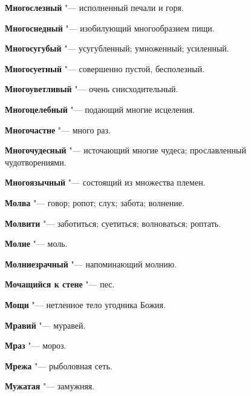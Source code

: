 \begin{mymulticols}{2}
\noindent\textbf{Многослезный} "--- исполненный печали и горя. 




\noindent\textbf{Многоснедный} "--- изобилующий многообразием пищи. 




\noindent\textbf{Многосугубый} "--- усугубленный; умноженный; усиленный. 




\noindent\textbf{Многосуетный} "--- совершенно пустой, бесполезный. 




\noindent\textbf{Многоуветливый} "--- очень снисходительный. 




\noindent\textbf{Многоцелебный} "--- подающий многие исцеления. 




\noindent\textbf{Многочастне} "--- много раз. 




\noindent\textbf{Многочудесный} "--- источающий многие чудеса; прославленный чудотворениями. 




\noindent\textbf{Многоязычный} "--- состоящий из множества племен. 




\noindent\textbf{Молва} "--- говор; ропот; слух; забота; волнение. 




\noindent\textbf{Молвити} "--- заботиться; суетиться; волноваться; роптать. 




\noindent\textbf{Молие} "--- моль. 




\noindent\textbf{Молниезрачный} "--- напоминающий молнию. 




\noindent\textbf{Мочащийся к стене} "--- пес. 




\noindent\textbf{Мощи} "--- нетленное тело угодника Божия. 




\noindent\textbf{Мравий} "--- муравей. 




\noindent\textbf{Мраз} "--- мороз. 




\noindent\textbf{Мрежа} "--- рыболовная сеть. 




\noindent\textbf{Мужатая} "--- замужняя. 





\end{mymulticols}
